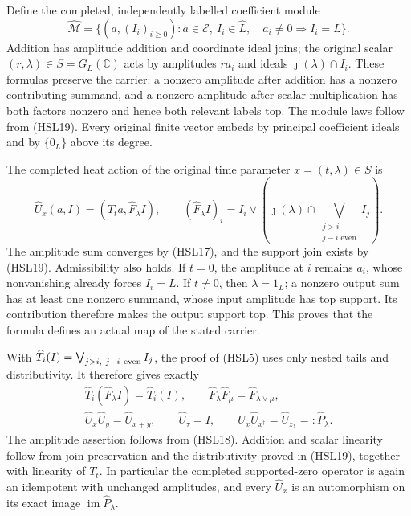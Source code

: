 Define the completed, independently labelled coefficient module
\begin{equation}\tag{HSL20}
 \widehat{\mathcal M}
 =\{(a,(I_i)_{i\ge0}):a\in\mathcal E,\ I_i\in\widehat L,\quad
                         a_i\ne0\Longrightarrow I_i=L\}.
\end{equation}
Addition has amplitude addition and coordinate ideal joins;
the original scalar $(r,\lambda)\in S=G_L(\mathbb C)$ acts
by amplitudes $ra_i$ and ideals $\jmath(\lambda)\cap I_i$.
These formulas preserve the carrier: a nonzero amplitude
after addition has a nonzero contributing summand, and a
nonzero amplitude after scalar multiplication has both factors
nonzero and hence both relevant labels top.
The module laws follow from (HSL19).
Every original finite vector embeds by principal coefficient
ideals and by $\{0_L\}$ above its degree.

The completed heat action of the original time parameter
$x=(t,\lambda)\in S$ is
\begin{equation}\tag{HSL21}
 \widehat U_x(a,I)=(T_ta,\widehat F_\lambda I),\qquad
 (\widehat F_\lambda I)_i
    =I_i\vee\left(\jmath(\lambda)\cap
                   \bigvee_{\substack{j>i\\j-i\text{ even}}}I_j\right).
\end{equation}
The amplitude sum converges by (HSL17), and the support join
exists by (HSL19). Admissibility also holds. If $t=0$, the
amplitude at $i$ remains $a_i$, whose nonvanishing already
forces $I_i=L$. If $t\ne0$, then $\lambda=1_L$; a nonzero
output sum has at least one nonzero summand, whose input
amplitude has top support. Its contribution therefore makes
the output support top. This proves that the formula defines
an actual map of the stated carrier.

With $\widehat T_i(I)=\bigvee_{j>i,\ j-i\ {\rm even}}I_j$,
the proof of (HSL5) uses only nested tails and distributivity.
It therefore gives exactly
\begin{equation}\tag{HSL22}
 \begin{gathered}
 \widehat T_i(\widehat F_\lambda I)=\widehat T_i(I),\qquad
 \widehat F_\lambda\widehat F_\mu
                      =\widehat F_{\lambda\vee\mu},\\
 \widehat U_x\widehat U_y=\widehat U_{x+y},\qquad
 \widehat U_\tau=I,\qquad
 \widehat U_x\widehat U_{x^\dagger}
       =\widehat U_{z_\lambda}=:\widehat P_\lambda .
 \end{gathered}
\end{equation}
The amplitude assertion follows from (HSL18). Addition and
scalar linearity follow from join preservation and the
distributivity proved in (HSL19), together with linearity of
$T_t$. In particular the completed supported-zero operator
is again an idempotent with unchanged amplitudes, and every
$\widehat U_x$ is an automorphism on its exact image
$\operatorname{im}\widehat P_\lambda$.

